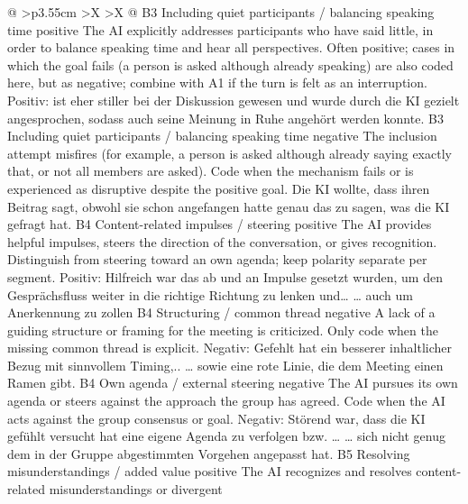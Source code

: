 \begin{xltabular}{\textwidth}{@{}
      >{\RaggedRight\arraybackslash}p{3.55cm}
      >{\RaggedRight\arraybackslash}X
      >{\RaggedRight\arraybackslash}X
    @{}}
    \cbgap
    \cbrow
      {B3}
      {Including quiet participants / balancing speaking time}
      {positive}
      {The AI explicitly addresses participants who have said little, in order to
      balance speaking time and hear all perspectives.}
      {Often positive; cases in which the goal fails (a person is asked although
      already speaking) are also coded here, but as negative; combine with A1 if
      the turn is felt as an interruption.}
      {Positiv:  ist eher stiller bei der Diskussion gewesen
      und wurde durch die KI gezielt angesprochen, sodass auch seine Meinung in
      Ruhe angehört werden konnte.}
    \cbgap
    \cbrow
      {B3}
      {Including quiet participants / balancing speaking time}
      {negative}
      {The inclusion attempt misfires (for example, a person is asked although
      already saying exactly that, or not all members are asked).}
      {Code when the mechanism fails or is experienced as disruptive despite the
      positive goal.}
      {Die KI wollte, dass  ihren Beitrag sagt, obwohl sie
      schon angefangen hatte genau das zu sagen, was die KI gefragt hat.}
    \cbgap
    \cbrow
      {B4}
      {Content-related impulses / steering}
      {positive}
      {The AI provides helpful impulses, steers the direction of the conversation,
      or gives recognition.}
      {Distinguish from steering toward an own agenda; keep polarity separate per
      segment.}
      {Positiv: Hilfreich war das ab und an Impulse gesetzt wurden, um den
      Gesprächsfluss weiter in die richtige Richtung zu lenken und… … auch um
      Anerkennung zu zollen}
    \cbgap
    \cbrow
      {B4}
      {Structuring / common thread}
      {negative}
      {A lack of a guiding structure or framing for the meeting is criticized.}
      {Only code when the missing common thread is explicit.}
      {Negativ: Gefehlt hat ein besserer inhaltlicher Bezug mit sinnvollem Timing,..
      … sowie eine rote Linie, die dem Meeting einen Ramen gibt.}
    \cbgap
    \cbrow
      {B4}
      {Own agenda / external steering}
      {negative}
      {The AI pursues its own agenda or steers against the approach the group has
      agreed.}
      {Code when the AI acts against the group consensus or goal.}
      {Negativ: Störend war, dass die KI gefühlt versucht hat eine eigene Agenda zu
      verfolgen bzw. … … sich nicht genug dem in der Gruppe abgestimmten Vorgehen
      angepasst hat.}
    \cbgap
    \cbrow
      {B5}
      {Resolving misunderstandings / added value}
      {positive}
      {The AI recognizes and resolves content-related misunderstandings or divergent
}
\end{xltabular}
